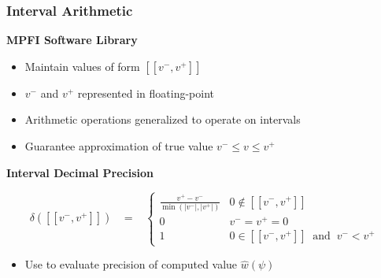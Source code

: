 \documentclass[t,pdf]{beamer}
\newcommand{\approximate}[1]{\hat{#1}}
\newcommand{\approxw}{\approximate{w}}
\newcommand{\aerror}{\delta}
\newcommand{\vmin}{v^{-}}
\newcommand{\vmax}{v^{+}}
\newcommand{\interval}[1]{[\![#1]\!]}
\begin{document}
\begin{frame}

\frametitle{Interval Arithmetic}

\medskip

\textbf{MPFI Software Library}
\begin{itemize}
\item Maintain values of form $\interval{\vmin, \vmax}$
\item $\vmin$ and $\vmax$ represented in floating-point
\item Arithmetic operations generalized to operate on intervals
\item Guarantee approximation of true value $v^{-} \leq v \leq v^{+}$
\end{itemize}

\bigskip

\textbf{Interval Decimal Precision}

\begin{displaymath}
\aerror(\interval{\vmin, \vmax}) \;\;\; = \;\;\; \left\{ \begin{array}{ll}
  \frac{\vmax - \vmin}{\min(|\vmin|, |\vmax|)}  & 0 \not \in \interval{\vmin, \vmax}\\[0.8em]
  0 & \vmin = \vmax = 0 \\
  1 & 0 \in \interval{\vmin, \vmax} \;\; \textrm{and} \;\; \vmin < \vmax
  \end{array} \right. \label{eqn:interval:error}
\end{displaymath}

\begin{itemize}
  \item Use to evaluate precision of computed value $\approxw(\psi)$
\end{itemize}

\end{frame}
\end{document}
